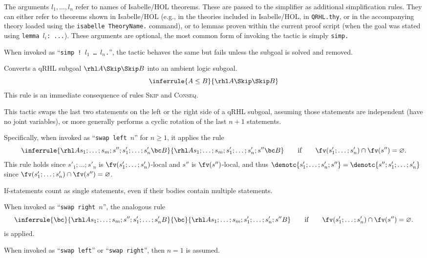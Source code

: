 \documentclass{article}
\renewcommand\rulerefx[1]{\hbox{\textsc{#1}}}
\begin{document}
The arguments $l_1,\dots,l_n$
refer to names of Isabelle/HOL theorems. These are passed to the
simplifier as additional simplification rules. They can either refer
to theorems shown in Isabelle/HOL (e.g., in the theories included in
Isabelle/HOL, in \texttt{QRHL.thy}, or in the accompanying theory
loaded using the \texttt{isabelle TheoryName.} command), or to lemmas
proven within the current proof script (when the goal was stated using
\texttt{\frenchspacing lemma $l_i$:
  ...}).  These arguments are optional, the most common form of
invoking the tactic is simply \texttt{simp.}


When invoked as ``\texttt{simp ! $l_1$
  \dots{} $l_n$.}'',
the tactic behaves the same but fails unless the subgoal is solved and
removed.



Converts a qRHL subgoal $\rhl A\Skip\Skip B$
into an ambient logic subgoal.
\[
\inferrule{
  A \leq B
}{
  \rhl A \Skip \Skip B
}
\]
This rule is an immediate consequence of rules \rulerefx{Skip} and \rulerefx{Conseq}.


This tactic swaps the last two statements on the left or the right side of a qRHL subgoal,
assuming those statements are independent (have no joint variables),
or more generally performs a cyclic rotation of the last $n+1$ statements.

Specifically, when invoked as ``\texttt{swap left $n$}'' for $n\geq1$, it applies the rule
\[
  \inferrule
  {\rhl A{s_1;\dots;s_{m};s'';s'_{1};\dots;s'_{n}}{\bc}{B}}
  {\rhl A{s_1;\dots;s_{m};s'_{1};\dots;s'_{n};s''}{\bc}{B}}
  \qquad
  \text{if}
  \qquad
  \fv(s'_{1};\dots;s'_{n})\cap \fv(s'')=\varnothing.
\]
This rule holds since $s'_{1};\dots;s'_{n}$
is $\fv(s'_{1};\dots;s'_{n})$-local
and $s''$
is $\fv(s'')$-local,
and thus $\denotc{s'_{1};\dots;s'_{n};s''}=\denotc{s'';s'_{1};\dots;s'_{n}}$
since $\fv(s'_{1};\dots;s'_{n})\cap \fv(s'')=\varnothing$.

If-statements count as single statements, even if their bodies contain
multiple statements.

When invoked as ``\texttt{swap right $n$}'', the analogous rule 
\[
  \inferrule
  {\bc}{\rhl A{s_1;\dots;s_{m};s'';s'_{1};\dots;s'_{n}}{B}}
  {\bc}{\rhl A{s_1;\dots;s_{m};s'_{1};\dots;s'_{n};s''}{B}}
  \qquad
  \text{if}
  \qquad
  \fv(s'_{1};\dots;s'_{n})\cap \fv(s'')=\varnothing.
\]
is applied.

When invoked as ``\texttt{swap left}'' or ``\texttt{swap right}'', then $n=1$ is assumed.
\end{document}
